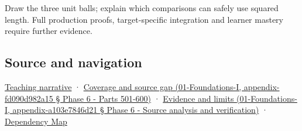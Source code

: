 Draw the three unit balls; explain which comparisons can safely use squared length. Full production proofs, target-specific integration and learner mastery require further evidence.

\subsection{Source and navigation}\label{source-and-navigation}

\href{Continuous\%20Notes/Computing\%20Foundations\%20-\%20From\%20Bits\%20to\%20C++\%20and\%20Systems\%20APIs\#A\%20ruler\%20needs\%20more\%20than\%20coordinate\%20components}{Teaching narrative} · \href{}{Coverage and source gap (01-Foundations-I, appendix-fd090d982a15 § Phase 6 - Parts 501-600)} · \href{}{Evidence and limits (01-Foundations-I, appendix-a103e7846d21 § Phase 6 - Source analysis and verification)} · \hyperref[appendix-4ad47bdd269a]{Dependency Map}
